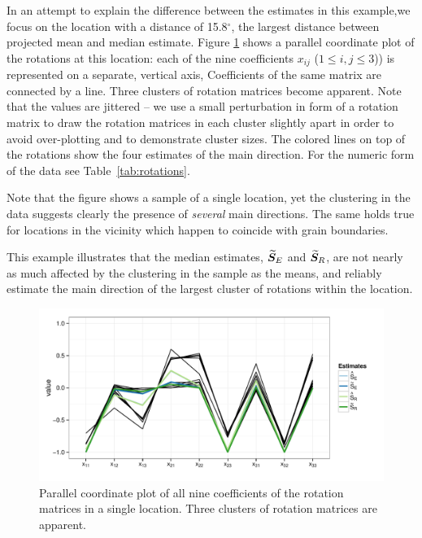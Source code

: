  In an attempt to explain the difference between the estimates in this example,we focus on the  location with a distance of 15.8$^\circ$, the largest distance between projected mean and median estimate. Figure \ref{fig:pcp} shows a parallel coordinate plot of the rotations at this location: each of the nine coefficients $x_{ij}$ ($1 \le i,j \le 3$)) is represented on a separate, vertical axis, Coefficients of the same matrix are connected by a line.  Three clusters of rotation matrices become apparent. Note that the values are jittered -- we use a small perturbation in form of a rotation matrix to draw the rotation matrices in each cluster slightly apart  in order to avoid over-plotting and to demonstrate cluster sizes. The colored lines on top of the rotations show the four estimates of the main direction.  For the numeric form of the data see Table~\ref{tab:rotations}.

Note that the figure shows a sample of a single location, yet the clustering in the data suggests clearly the presence of \emph{several} main directions. The same holds true for locations in the vicinity which happen to coincide with grain boundaries. 

This example illustrates that the median estimates, ${\widetilde{\bm S}_E}$  and ${\widetilde{\bm S}_R}$, are not nearly as much affected by the clustering in the sample as the means, and reliably estimate the main direction of the largest cluster of rotations within the location.


\begin{figure}[htbp] %
   \centering
   \includegraphics[width=.7\textwidth]{images/pcp.pdf} 
   \caption{ \label{fig:pcp}Parallel coordinate plot of all nine coefficients of the rotation matrices in a single location. Three clusters of rotation matrices are apparent.  }
\end{figure}



